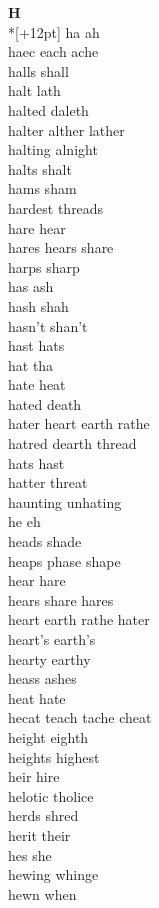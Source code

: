 \vspace{14pt}
\noindent\textbf{\Large H}\\*[+12pt]
ha ah\\
haec each ache\\
halls shall\\
halt lath\\
halted daleth\\
halter alther lather\\
halting alnight\\
halts shalt\\
hams sham\\
hardest threads\\
hare hear\\
hares hears share\\
harps sharp\\
has ash\\
hash shah\\
hasn't shan't\\
hast hats\\
hat tha\\
hate heat\\
hated death\\
hater heart earth rathe\\
hatred dearth thread\\
hats hast\\
hatter threat\\
haunting unhating\\
he eh\\
heads shade\\
heaps phase shape\\
hear hare\\
hears share hares\\
heart earth rathe hater\\
heart's earth's\\
hearty earthy\\
heass ashes\\
heat hate\\
hecat teach tache cheat\\
height eighth\\
heights highest\\
heir hire\\
helotic tholice\\
herds shred\\
herit their\\
hes she\\
hewing whinge\\
hewn when\\
